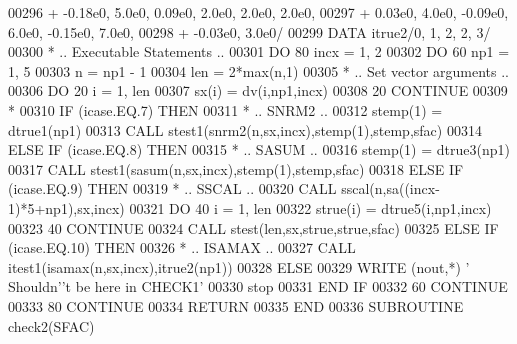 \begin{DoxyCode}
00296      +                  -0.18e0, 5.0e0, 0.09e0, 2.0e0, 2.0e0, 2.0e0,
00297      +                  0.03e0, 4.0e0, -0.09e0, 6.0e0, -0.15e0, 7.0e0,
00298      +                  -0.03e0, 3.0e0/
00299       \textcolor{keyword}{DATA}              itrue2/0, 1, 2, 2, 3/
00300 \textcolor{comment}{*     .. Executable Statements ..}
00301       \textcolor{keywordflow}{DO} 80 incx = 1, 2
00302          \textcolor{keywordflow}{DO} 60 np1 = 1, 5
00303             n = np1 - 1
00304             len = 2*max(n,1)
00305 \textcolor{comment}{*           .. Set vector arguments ..}
00306             \textcolor{keywordflow}{DO} 20 i = 1, len
00307                sx(i) = dv(i,np1,incx)
00308    20       \textcolor{keywordflow}{CONTINUE}
00309 \textcolor{comment}{*}
00310             \textcolor{keywordflow}{IF} (icase.EQ.7) \textcolor{keywordflow}{THEN}
00311 \textcolor{comment}{*              .. SNRM2 ..}
00312                stemp(1) = dtrue1(np1)
00313                \textcolor{keyword}{CALL }stest1(snrm2(n,sx,incx),stemp(1),stemp,sfac)
00314             \textcolor{keywordflow}{ELSE} \textcolor{keywordflow}{IF} (icase.EQ.8) \textcolor{keywordflow}{THEN}
00315 \textcolor{comment}{*              .. SASUM ..}
00316                stemp(1) = dtrue3(np1)
00317                \textcolor{keyword}{CALL }stest1(sasum(n,sx,incx),stemp(1),stemp,sfac)
00318             \textcolor{keywordflow}{ELSE} \textcolor{keywordflow}{IF} (icase.EQ.9) \textcolor{keywordflow}{THEN}
00319 \textcolor{comment}{*              .. SSCAL ..}
00320                \textcolor{keyword}{CALL }sscal(n,sa((incx-1)*5+np1),sx,incx)
00321                \textcolor{keywordflow}{DO} 40 i = 1, len
00322                   strue(i) = dtrue5(i,np1,incx)
00323    40          \textcolor{keywordflow}{CONTINUE}
00324                \textcolor{keyword}{CALL }stest(len,sx,strue,strue,sfac)
00325             \textcolor{keywordflow}{ELSE} \textcolor{keywordflow}{IF} (icase.EQ.10) \textcolor{keywordflow}{THEN}
00326 \textcolor{comment}{*              .. ISAMAX ..}
00327                \textcolor{keyword}{CALL }itest1(isamax(n,sx,incx),itrue2(np1))
00328             \textcolor{keywordflow}{ELSE}
00329                \textcolor{keyword}{WRITE} (nout,*) \textcolor{stringliteral}{' Shouldn'}\textcolor{stringliteral}{'t be here in CHECK1'}
00330                stop
00331 \textcolor{keywordflow}{            END IF}
00332    60    \textcolor{keywordflow}{CONTINUE}
00333    80 \textcolor{keywordflow}{CONTINUE}
00334       \textcolor{keywordflow}{RETURN}
00335 \textcolor{keyword}{      END}
00336 \textcolor{keyword}{      SUBROUTINE }check2(SFAC)

\end{DoxyCode}
